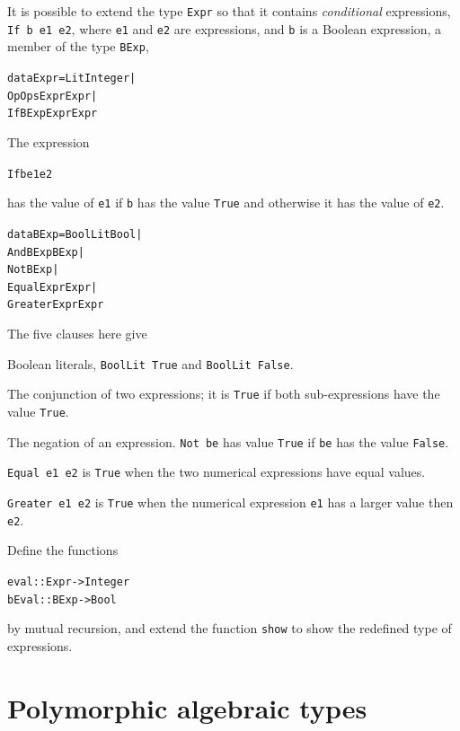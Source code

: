 \begin{exercises}
\item
It is possible to extend the type \texttt{Expr} so that it contains
{\em conditional \/}
expressions, \texttt{If b e1 e2},
where \texttt{e1} and \texttt{e2} are expressions, and
\texttt{b} is a Boolean expression, a member of the type \texttt{BExp},
\begin{alltt}
data Expr = Lit Integer |
            Op Ops Expr Expr |
            If BExp Expr Expr
\end{alltt}
The expression
\begin{alltt}
If b e1 e2
\end{alltt}
has the value of \texttt{e1} if \texttt{b} has the
value \texttt{True} and otherwise it has the value of \texttt{e2}.
\begin{alltt}
data BExp = BoolLit Bool |
            And BExp BExp |
            Not BExp |
            Equal Expr Expr |
            Greater Expr Expr
\end{alltt}
The five clauses here give
\begin{titemize}
\item Boolean literals, \texttt{BoolLit True} and \texttt{BoolLit False}.
\item The conjunction of two expressions; it is \texttt{True} if both sub-expressions have
the value \texttt{True}.
\item The negation of an expression. \texttt{Not be} has value \texttt{True} if
\texttt{be} has the value \texttt{False}.
\item \texttt{Equal e1 e2} is \texttt{True} when the two numerical expressions have
equal values.
\item \texttt{Greater e1 e2} is \texttt{True} when the numerical expression 
\texttt{e1} has a larger value then \texttt{e2}.
\end{titemize}
Define the functions 
\begin{alltt}
eval  :: Expr -> Integer 
bEval :: BExp -> Bool
\end{alltt}
by mutual recursion, and
extend the function \texttt{show} to show the redefined type of expressions.
\end{exercises}
\section{Polymorphic algebraic types}
\label{polyAlg}


